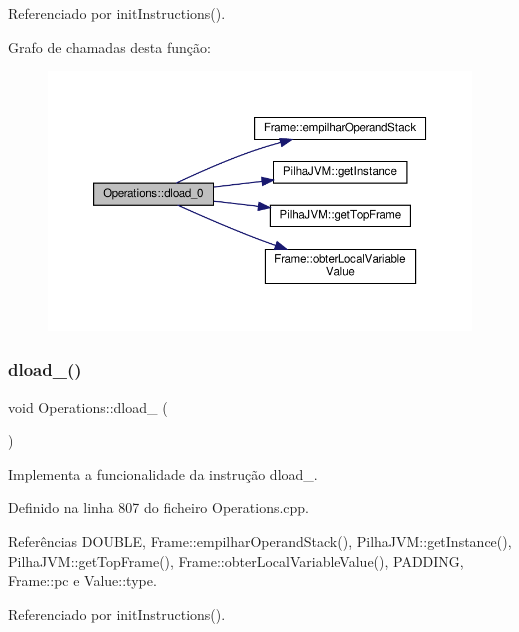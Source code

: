 Referenciado por init\+Instructions().

Grafo de chamadas desta função\+:\nopagebreak
\begin{figure}[H]
\begin{center}
\leavevmode
\includegraphics[width=350pt]{classOperations_a176a81199439e0b22d206c72ea4a1fba_cgraph}
\end{center}
\end{figure}
\mbox{\label{classOperations_a64632251d88964ff4da0d981103e099c}} 
\subsubsection{\texorpdfstring{dload\+\_()}{dload\_1()}}
{\footnotesize\ttfamily void Operations\+::dload\+\_ (\begin{DoxyParamCaption}{ }\end{DoxyParamCaption})\hspace{0.3cm}{\ttfamily [private]}}



Implementa a funcionalidade da instrução dload\+\_. 



Definido na linha 807 do ficheiro Operations.\+cpp.



Referências D\+O\+U\+B\+LE, Frame\+::empilhar\+Operand\+Stack(), Pilha\+J\+V\+M\+::get\+Instance(), Pilha\+J\+V\+M\+::get\+Top\+Frame(), Frame\+::obter\+Local\+Variable\+Value(), P\+A\+D\+D\+I\+NG, Frame\+::pc e Value\+::type.



Referenciado por init\+Instructions().

